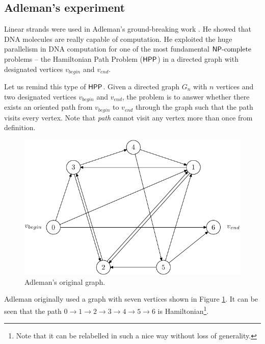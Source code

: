 	\subsection{Adleman's experiment}
	\label{sec:adleman}
		
		Linear strands were used in Adleman's ground-breaking work \cite{adleman94}. He showed that DNA molecules are really capable of computation. He exploited the huge parallelism in DNA computation for one of the most fundamental $\mathsf{NP}\textnormal{-complete}$ problems -- the Hamiltonian Path Problem ($\sf HPP$) in a directed graph with designated vertices $v_{begin}$ and $v_{end}$.
		
		Let us remind this type of $\sf HPP$. Given a directed graph $G_n$ with $n$ vertices and two designated vertices $v_{begin}$ and $v_{end}$, the problem is to answer whether there exists an oriented path from $v_{begin}$ to $v_{end}$ through the graph such that the path visits every vertex. Note that {\em path} cannot visit any vertex more than once from definition.
		
		\begin{figure}[h]
		\begin{center}
			\includegraphics{./figures/adleman_graph.pdf}
			\caption{Adleman's original graph.}
			\label{fig:adleman_graph}
		\end{center}
		\end{figure}
		
		Adleman originally used a graph with seven vertices shown in Figure \ref{fig:adleman_graph}. It can be seen that the path $0 \rightarrow 1 \rightarrow 2 \rightarrow 3 \rightarrow 4 \rightarrow 5 \rightarrow 6$ is Hamiltonian\footnote{Note that it can be relabelled in such a nice way without loss of generality.}.
		
